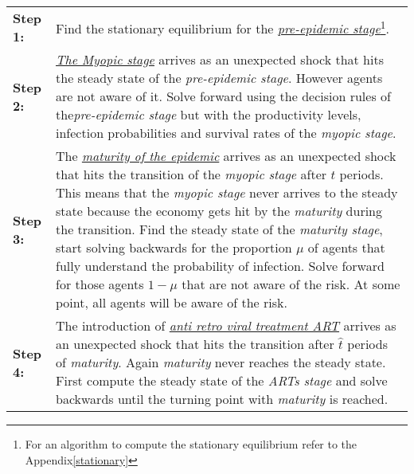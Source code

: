 \begin{tabular}{p{2cm}p{12cm}}
\textbf{Step 1:}& Find the stationary equilibrium for the \underline{\textit{pre-epidemic stage}}\footnote{For an algorithm to compute the stationary equilibrium refer to the Appendix\ref{stationary}}.\\
\textbf{Step 2:}& \underline{\textit{The Myopic stage}} arrives as an unexpected shock that hits the steady state of the \textit{pre-epidemic stage}. However agents are not aware of it. Solve forward using the decision rules of the\textit{pre-epidemic stage} but with the productivity levels, infection probabilities and survival rates of the  \textit{myopic stage}. \\
\textbf{Step 3:}& The \underline{\textit{maturity of the epidemic}} arrives as an unexpected shock that hits the transition of the \textit{myopic stage} after $t$ periods. This means that the \textit{myopic stage} never arrives to the steady state because the economy gets hit by the \textit{maturity} during the transition. Find the steady state of the \textit{maturity stage}, start solving backwards for the proportion $\mu$ of agents that fully understand the probability of infection. Solve forward for those agents $1-\mu$ that are not aware of the risk. At some point, all agents will be aware of the risk.\\
\textbf{Step 4:}& The introduction of \underline{\textit{anti retro viral treatment ART}} arrives as an unexpected shock that hits the transition after $\hat{t}$ periods of \textit{maturity}. Again \textit{maturity} never reaches the steady state. First compute the steady state of the \textit{ARTs stage} and solve backwards until the turning point with \textit{maturity} is reached.\\
\end{tabular}
